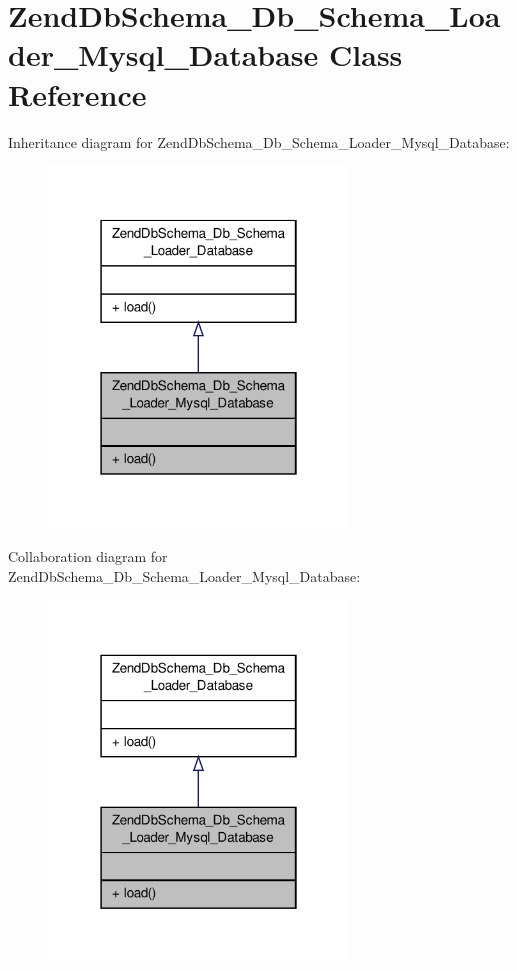 \hypertarget{classZendDbSchema__Db__Schema__Loader__Mysql__Database}{\section{Zend\-Db\-Schema\-\_\-\-Db\-\_\-\-Schema\-\_\-\-Loader\-\_\-\-Mysql\-\_\-\-Database Class Reference}
\label{classZendDbSchema__Db__Schema__Loader__Mysql__Database}
}


Inheritance diagram for Zend\-Db\-Schema\-\_\-\-Db\-\_\-\-Schema\-\_\-\-Loader\-\_\-\-Mysql\-\_\-\-Database\-:\nopagebreak
\begin{figure}[H]
\begin{center}
\leavevmode
\includegraphics[width=226pt]{classZendDbSchema__Db__Schema__Loader__Mysql__Database__inherit__graph}
\end{center}
\end{figure}


Collaboration diagram for Zend\-Db\-Schema\-\_\-\-Db\-\_\-\-Schema\-\_\-\-Loader\-\_\-\-Mysql\-\_\-\-Database\-:\nopagebreak
\begin{figure}[H]
\begin{center}
\leavevmode
\includegraphics[width=226pt]{classZendDbSchema__Db__Schema__Loader__Mysql__Database__coll__graph}
\end{center}
\end{figure}
